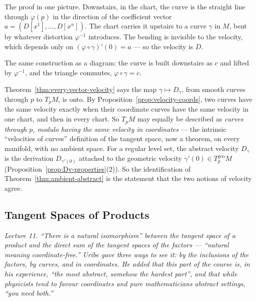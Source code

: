 \documentclass[11pt]{report}
\newcommand{\geo}{\mathrm{geo}}
\begin{document}
The proof in one picture. Downstairs, in the chart, the curve is the straight line through $\varphi(p)$ in the direction of the coefficient vector $a = (D[x^1], \ldots, D[x^n])$. The chart carries it upstairs to a curve $\gamma$ in $M$, bent by whatever distortion $\varphi^{-1}$ introduces. The bending is invisible to the velocity, which depends only on $(\varphi \circ \gamma)'(0) = a$ --- so the velocity is $D$.

\begin{center}
\end{center}

The same construction as a diagram: the curve is built downstairs as $c$ and lifted by $\varphi^{-1}$, and the triangle commutes, $\varphi \circ \gamma = c$.

\begin{rembox}\label{rem:two-faces-reconciled}
Theorem~\ref{thm:every-vector-velocity} says the map $\gamma \mapsto D_\gamma$, from smooth curves through $p$ to $T_pM$, is onto. By Proposition~\ref{prop:velocity-coords}, two curves have the same velocity exactly when their coordinate curves have the same velocity in one chart, and then in every chart. So $T_pM$ may equally be described as \emph{curves through $p$, modulo having the same velocity in coordinates} --- the intrinsic ``velocities of curves'' definition of the tangent space, now a theorem, on every manifold, with no ambient space. For a regular level set, the abstract velocity $D_\gamma$ is the derivation $D_{\gamma'(0)}$ attached to the geometric velocity $\gamma'(0) \in T^{\geo}_pM$ (Proposition~\ref{prop:Dv-properties}(2)). So the identification of Theorem~\ref{thm:ambient-abstract} is the statement that the two notions of velocity agree.
\end{rembox}

\subsection{Tangent Spaces of Products}\label{sub:tangent-products}

\textit{Lecture 11. ``There is a natural isomorphism'' between the tangent space of a product and the direct sum of the tangent spaces of the factors --- ``natural meaning coordinate-free.'' Uribe gave three ways to see it: by the inclusions of the factors, by curves, and in coordinates. He added that this part of the course is, in his experience, ``the most abstract, somehow the hardest part'', and that while physicists tend to favour coordinates and pure mathematicians abstract settings, ``you need both.''}
\end{document}
